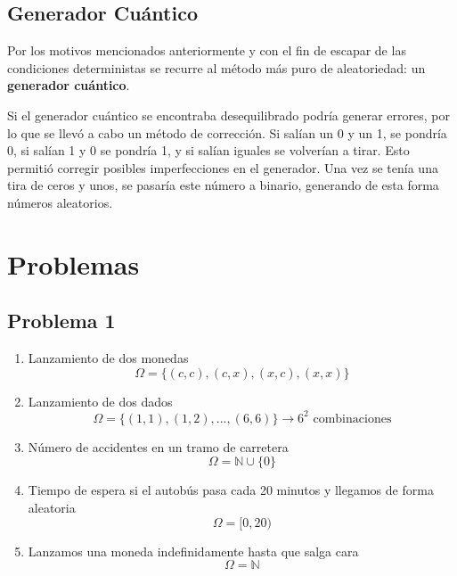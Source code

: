 \documentclass[11pt]{article}
\newcommand{\N}{\mathbb{N}}
\newcommand{\OMG}{\varOmega}
\theoremstyle{plain}
\begin{document}
        \subsection{Generador Cuántico} %
        \label{sub:generador_cuántico}
            Por los motivos mencionados anteriormente y con el fin de escapar de las condiciones deterministas se recurre al método más puro de aleatoriedad: un \textbf{generador cuántico}.

            Si el generador cuántico se encontraba desequilibrado podría generar errores, por lo que se llevó a cabo un método de corrección. Si salían un 0 y un 1, se pondría 0, si salían 1 y 0 se pondría 1, y si salían iguales se volverían a tirar. Esto permitió corregir posibles imperfecciones en el generador. Una vez se tenía una tira de ceros y unos, se pasaría este número a binario, generando de esta forma números aleatorios.




    \newpage
    \section{Problemas} %
    \label{sec:problemas}
        \subsection{Problema 1} %
        \label{sub:problema_1}
            \begin{enumerate}[label=\Alph*]
                \item Lanzamiento de dos monedas \[\OMG = \{(c,c),(c,x),(x,c),(x,x)\}\]
                \item Lanzamiento de dos dados \[\OMG = \{(1,1),(1,2),...,(6,6)\} \rightarrow 6^2 \text{ combinaciones}\]
                \item Número de accidentes en un tramo de carretera \[\OMG = \N \cup \{0\}\]
                \item Tiempo de espera si el autobús pasa cada 20 minutos y llegamos de forma aleatoria \[\OMG = [0,20)\]
                \item Lanzamos una moneda indefinidamente hasta que salga cara \[\OMG = \N\] 
            \end{enumerate}        
\end{document}
